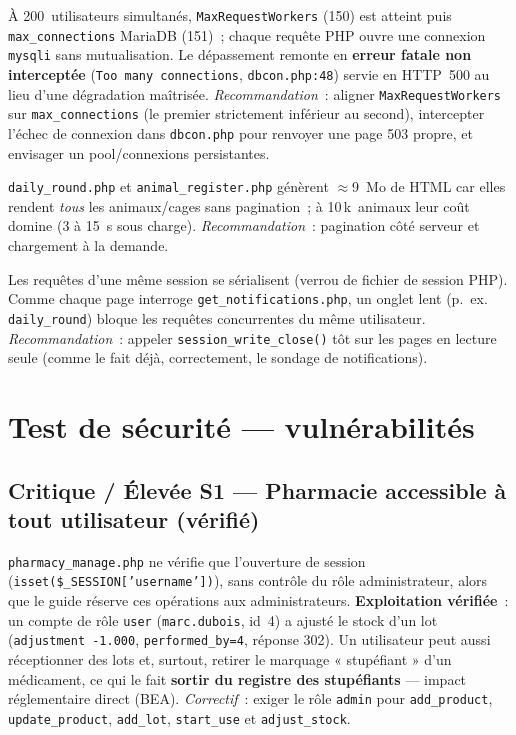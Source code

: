 \documentclass[11pt,a4paper]{article}
\newcommand{\sev}[2]{\textcolor{#1}{\textbf{#2}}}
\newcommand{\crit}{\sev{crit}{Critique}}
\newcommand{\hoch}{\sev{high}{Élevée}}
\newcommand{\med}{\sev{med}{Moyenne}}
\begin{document}
\begin{description}[leftmargin=0pt,style=unboxed,itemsep=0.6ex]
  \item[\hoch{} C1 --- Épuisement des connexions MariaDB sous rafale.]
    À 200~utilisateurs simultanés, \texttt{MaxRequestWorkers} (150) est atteint
    puis \texttt{max\_connections} MariaDB (151)~; chaque requête PHP ouvre une
    connexion \texttt{mysqli} sans mutualisation. Le dépassement remonte en
    \textbf{erreur fatale non interceptée} (\texttt{Too many connections},
    \texttt{dbcon.php:48}) servie en HTTP~500 au lieu d'une dégradation
    maîtrisée. \emph{Recommandation}~: aligner \texttt{MaxRequestWorkers} sur
    \texttt{max\_connections} (le premier strictement inférieur au second),
    intercepter l'échec de connexion dans \texttt{dbcon.php} pour renvoyer une
    page 503 propre, et envisager un pool/connexions persistantes.
  \item[\hoch{} C2 --- Pages volumineuses non paginées.]
    \texttt{daily\_round.php} et \texttt{animal\_register.php} génèrent
    $\approx$9~Mo de HTML car elles rendent \emph{tous} les animaux/cages sans
    pagination~; à 10\,k~animaux leur coût domine (3 à 15~s sous charge).
    \emph{Recommandation}~: pagination côté serveur et chargement à la demande.
  \item[\med{} C3 --- Sérialisation par verrou de session.]
    Les requêtes d'une même session se sérialisent (verrou de fichier de
    session PHP). Comme chaque page interroge \texttt{get\_notifications.php},
    un onglet lent (p.~ex. \texttt{daily\_round}) bloque les requêtes
    concurrentes du même utilisateur. \emph{Recommandation}~: appeler
    \texttt{session\_write\_close()} tôt sur les pages en lecture seule (comme
    le fait déjà, correctement, le sondage de notifications).
\end{description}

\section{Test de sécurité --- vulnérabilités}

\subsection*{\crit{} / \hoch{} S1 --- Pharmacie accessible à tout utilisateur (vérifié)}
\texttt{pharmacy\_manage.php} ne vérifie que l'ouverture de session
(\texttt{isset(\$\_SESSION['username'])}), sans contrôle du rôle administrateur,
alors que le guide réserve ces opérations aux administrateurs.
\textbf{Exploitation vérifiée}~: un compte de rôle \texttt{user}
(\texttt{marc.dubois}, id~4) a ajusté le stock d'un lot
(\texttt{adjustment -1.000}, \texttt{performed\_by=4}, réponse 302). Un
utilisateur peut aussi réceptionner des lots et, surtout, retirer le marquage
« stupéfiant » d'un médicament, ce qui le fait \textbf{sortir du registre des
stupéfiants} --- impact réglementaire direct (BEA).
\emph{Correctif}~: exiger le rôle \texttt{admin} pour \texttt{add\_product},
\texttt{update\_product}, \texttt{add\_lot}, \texttt{start\_use} et
\texttt{adjust\_stock}.
\end{document}

